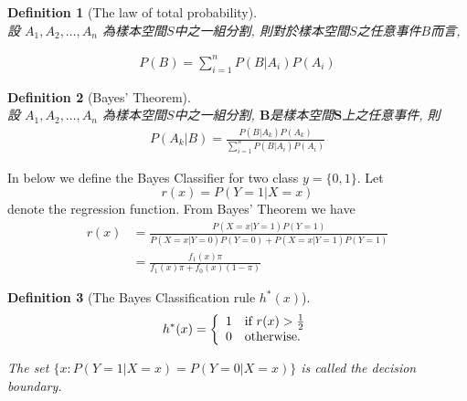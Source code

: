 \documentclass[12pt,a4paper]{article}%
\newtheorem{definition}{Definition}
\theoremstyle{definition}
\theoremstyle{plain}
\numberwithin{equation}{section}
\begin{document}
\begin{framed}
\begin{CJK}{UTF8}{cwmb}
\begin{definition}[The law of total probability]
~\\
設 $A_{1},A_{2},\dots,A_{n}$ 為樣本空間$S$中之一組分割, 則對於樣本空間$S$之任意事件$B$而言, 

\begin{gather*}
P(B) = \sum\limits_{i=1}^{n}P(B|A_{i})P(A_{i})
\end{gather*}
\end{definition}
\end{CJK}
\end{framed}

\begin{framed}
\begin{CJK}{UTF8}{cwmb}
\begin{definition}[Bayes' Theorem]
~\\
設 $A_{1},A_{2},\dots,A_{n}$ 為樣本空間$S$中之一組分割, $\mathbf{B}$是樣本空間$\mathbf{S}$上之任意事件, 則
\begin{gather*}
P(A_{k}|B) = \frac{P(B|A_{k})P(A_{k})}{\sum\limits_{i=1}^{n}P(B|A_{i})P(A_{i})}
\end{gather*}
\end{definition}
\end{CJK}
\end{framed}
In below we define the Bayes Classifier for two class $y=\{0,1\}$. Let 
\begin{equation}
r(x) = P(Y=1|X=x)
\end{equation}
denote the regression function. From Bayes' Theorem we have
\begin{align*}
r(x) &= \frac{P(X=x|Y=1)P(Y=1)}{P(X=x|Y=0)P(Y=0)+P(X=x|Y=1)P(Y=1)} \\
	 &= \frac{f_{1}(x)\pi}{f_{1}(x)\pi + f_{0}(x)(1-\pi)}
\end{align*}

\begin{framed}
\begin{definition}[The Bayes Classification rule $h^{*}(x)$]
~\\
\begin{gather*}
h^{*}(x) = \left\{
  \begin{array}{ll}
    1 & \mbox{\rm if } r(x)> \frac{1}{2}\\
    0 & \mbox{\rm otherwise.} \\
   \end{array} \right.
\end{gather*}

The set $\{x : P(Y=1|X=x) = P(Y=0|X=x) \}$ is called the decision boundary.

\end{definition}
\end{framed}
\end{document}
